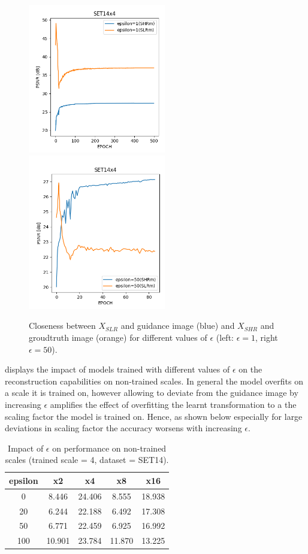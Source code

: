\begin{figure}[!htbp]
	\centering
	\includegraphics[width=6cm]{figures/epsball_loss_1_set14}
  \includegraphics[width=6cm]{figures/epsball_loss_50_set14}
	\caption{Closeness between $X_{SLR}$ and guidance image (blue) and $X_{SHR}$
  and groudtruth image (orange) for different values of $\epsilon$ (left:
  $\epsilon = 1$, right $\epsilon = 50$).}
  \label{fig:epsball_loss}
\end{figure}

 displays the impact of models trained
with different values of $\epsilon$ on the reconstruction capabilities on
non-trained scales. In general the model overfits on a scale it is trained on,
however allowing to deviate from the guidance image by increasing $\epsilon$
amplifies the effect of overfitting the learnt transformation to a the scaling
factor the model is trained on. Hence, as shown below especially for large
deviations in scaling factor the accuracy worsens with increasing $\epsilon$.

\begin{table}[!htbp]
	\begin{center}
	\begin{tabular}{c|c|c|c|c}
	epsilon & x2 & x4 & x8 & x16 \\
	\hline
	0 & 8.446 & 24.406 & 8.555 & 18.938 \\
	20 & 6.244 & 22.188 & 6.492 & 17.308 \\
	50 & 6.771 & 22.459 & 6.925 & 16.992 \\
	100 & 10.901 & 23.784 & 11.870 & 13.225 \\
	\end{tabular}
	\caption{Impact of $\epsilon$ on performance on non-trained scales
	(trained scale = 4, dataset = SET14).}
	\label{table:epsilonotherscales}
	\end{center}
\end{table}

